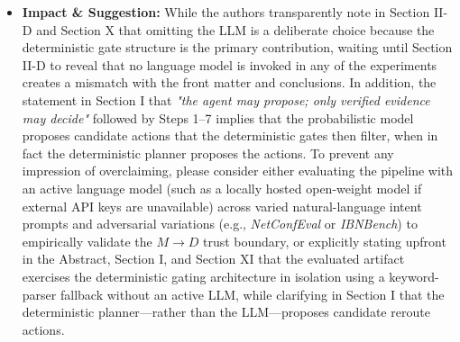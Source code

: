 \documentclass[11pt,a4paper]{article}
\begin{document}
\begin{enumerate}[leftmargin=1.6em,itemsep=3pt]
\begin{itemize}[leftmargin=1.8em,itemsep=2pt]
\item \textbf{Impact \& Suggestion:} While the authors transparently note in Section II-D and Section X that omitting the LLM is a deliberate choice because the deterministic gate structure is the primary contribution, waiting until Section II-D to reveal that no language model is invoked in any of the experiments creates a mismatch with the front matter and conclusions. In addition, the statement in Section I that \emph{"the agent may propose; only verified evidence may decide"} followed by Steps 1–7 implies that the probabilistic model proposes candidate actions that the deterministic gates then filter, when in fact the deterministic planner proposes the actions. To prevent any impression of overclaiming, please consider either evaluating the pipeline with an active language model (such as a locally hosted open-weight model if external API keys are unavailable) across varied natural-language intent prompts and adversarial variations (e.g., \emph{NetConfEval} or \emph{IBNBench}) to empirically validate the $M \to D$ trust boundary, or explicitly stating upfront in the Abstract, Section I, and Section XI that the evaluated artifact exercises the deterministic gating architecture in isolation using a keyword-parser fallback without an active LLM, while clarifying in Section I that the deterministic planner—rather than the LLM—proposes candidate reroute actions.
\end{itemize}
\end{enumerate}
\end{document}
